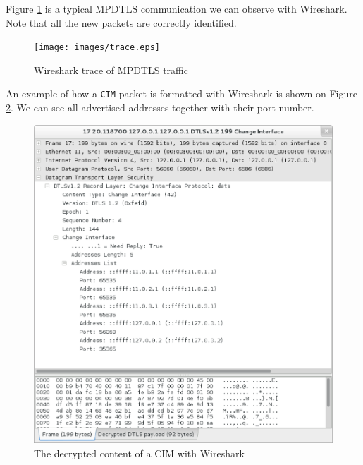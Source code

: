 Figure \ref{fig:trace} is a typical MPDTLS communication we can observe with Wireshark. Note that all the new packets are correctly identified.

\begin{figure}[!ht]
\centering
\texttt{[image: images/trace.eps]}
\caption{Wireshark trace of MPDTLS traffic}
\label{fig:trace}
\end{figure}


An example of how a \texttt{CIM} packet is formatted with Wireshark is shown on Figure \ref{fig:cimdetail}. We can see all advertised addresses together with their port number. 

\begin{figure}[!ht]
\centering
\includegraphics[width=\textwidth]{images/cimdetail.eps}
\caption{The decrypted content of a CIM with Wireshark}
\label{fig:cimdetail}
\end{figure}
